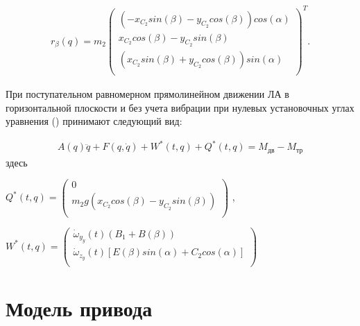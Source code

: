 \begin{equation}
\label{eq:p3:48+5}
\begin{multlined}
r_{ \beta } \left( q \right) =m_{2} \left( \begin{matrix}
\left( -x_{C_{2}}sin \left( \beta \right) -y_{C_{2}}cos \left( \beta \right) \right) cos \left( \alpha \right) \\
x_{C_{2}}cos \left( \beta \right) -y_{C_{2}}sin \left( \beta \right) \\
\left( x_{C_{2}}sin \left( \beta \right) +y_{C_{2}}cos \left( \beta \right) \right) sin \left( \alpha \right) \\
\end{matrix}
\right) ^{T}.
\end{multlined}
\end{equation}

При поступательном равномерном прямолинейном движении ЛА в горизонтальной плоскости и без учета вибрации при нулевых установочных углах уравнения () принимают следующий вид: 


\begin{equation}%
\label{eq:p3:49}
\begin{multlined}
A \left( q \right) \ddot q+F \left( q,\dot q \right) + W^{\ast}(t,q) +Q^{\ast} \left( t,q \right) = M_{\textit{дв}}-M_{\textit{тр}}
\end{multlined}
\end{equation}
здесь 

\( Q^{\ast} \left( t,q \right) = \left( \begin{matrix}
0\\
m_{2}g \left( x_{C_{2}}cos \left( \beta \right) -y_{C_{2}}sin \left( \beta \right) \right) \\
\end{matrix}
\right) \) , 

$W^{\ast}(t,q) = 
\left( \begin{matrix}
\dot \omega _{y_{y}} ( t ) ( B_{1}+B ( \beta ) )\\
\dot \omega _{z_{y}} \left( t \right) \left[ E \left( \beta \right) sin \left( \alpha \right) +C_{2}cos \left( \alpha \right) \right] \\
\end{matrix}
\right)
$

\section{Модель привода} \label{ch:ch3/sect9}


